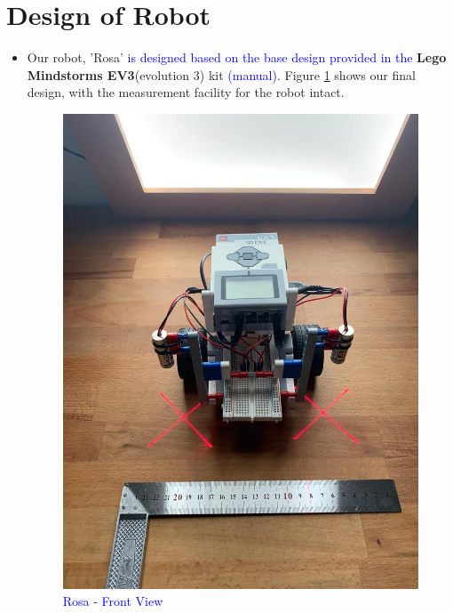     \section{Design of Robot}
    {
    \begin{itemize}
        \item Our robot, 'Rosa' \textcolor{blue}{is designed based on the base design provided in the} \textbf{Lego Mindstorms EV3}(evolution 3) kit \textcolor{blue}{(manual)}. Figure \ref{fig:Rosa front view} shows our final design, with the measurement facility for the robot intact. 
        
        \begin{figure}[!ht] %
            \centering
            \includegraphics[scale=0.3]{images/FrontView.jpeg}
            \caption{\textcolor{blue}{Rosa - Front View}}
            \label{fig:Rosa front view}
        \end{figure}
        

\end{itemize}}
